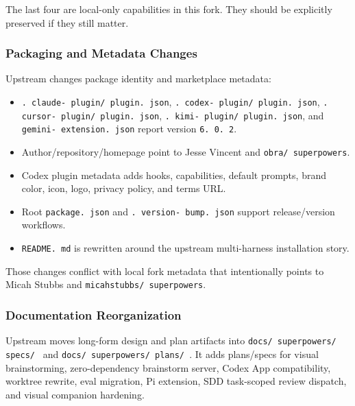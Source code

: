 \documentclass[twocolumn,10pt,letterpaper]{article}
\begin{document}
The last four are local-only capabilities in this fork. They should be explicitly preserved if they still matter.


\subsubsection{Packaging and Metadata Changes}

Upstream changes package identity and marketplace metadata:


\begin{itemize}
\setlength{\itemsep}{0pt}
\setlength{\parskip}{0pt}
  \item \texttt{. claude- plugin/ plugin. json}, \texttt{. codex- plugin/ plugin. json}, \texttt{. cursor- plugin/ plugin. json}, \texttt{. kimi- plugin/ plugin. json}, and \texttt{gemini- extension. json} report version \texttt{6. 0. 2}.
  \item Author/repository/homepage point to Jesse Vincent and \texttt{obra/ superpowers}.
  \item Codex plugin metadata adds hooks, capabilities, default prompts, brand color, icon, logo, privacy policy, and terms URL.
  \item Root \texttt{package. json} and \texttt{. version- bump. json} support release/version workflows.
  \item \texttt{README. md} is rewritten around the upstream multi-harness installation story.
\end{itemize}

Those changes conflict with local fork metadata that intentionally points to Micah Stubbs and \texttt{micahstubbs/ superpowers}.


\subsubsection{Documentation Reorganization}

Upstream moves long-form design and plan artifacts into \texttt{docs/ superpowers/ specs/ } and \texttt{docs/ superpowers/ plans/ }. It adds plans/specs for visual brainstorming, zero-dependency brainstorm server, Codex App compatibility, worktree rewrite, eval migration, Pi extension, SDD task-scoped review dispatch, and visual companion hardening.
\end{document}
